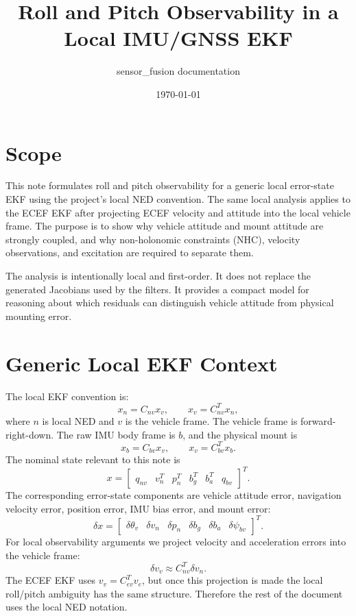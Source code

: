 \documentclass[11pt]{article}
\title{Roll and Pitch Observability in a Local IMU/GNSS EKF}
\author{sensor\_fusion documentation}
\date{\today}
\newcommand{\T}{^{T}}
\begin{document}
\maketitle
\tableofcontents
\newpage

\section{Scope}

This note formulates roll and pitch observability for a generic local
error-state EKF using the project's local NED convention. The same local
analysis applies to the ECEF EKF after projecting ECEF velocity and
attitude into the local vehicle frame. The purpose is to show why vehicle
attitude and mount attitude are strongly coupled, and why non-holonomic
constraints (NHC), velocity observations, and excitation are required to
separate them.

The analysis is intentionally local and first-order. It does not replace the
generated Jacobians used by the filters. It provides a compact model for
reasoning about which residuals can distinguish vehicle attitude from physical
mounting error.

\section{Generic Local EKF Context}

The local EKF convention is:
\begin{equation}
  x_n=C_{nv}x_v,\qquad x_v=C_{nv}\T x_n ,
\end{equation}
where \(n\) is local NED and \(v\) is the vehicle frame. The vehicle frame is
forward-right-down. The raw IMU body frame is \(b\), and the physical mount is
\begin{equation}
  x_b=C_{bv}x_v,\qquad x_v=C_{bv}\T x_b .
\end{equation}
The nominal state relevant to this note is
\begin{equation}
  x=
  \begin{bmatrix}
  q_{nv} & v_n\T & p_n\T & b_g\T & b_a\T & q_{bv}
  \end{bmatrix}\T .
\end{equation}
The corresponding error-state components are vehicle attitude error,
navigation velocity error, position error, IMU bias error, and mount error:
\begin{equation}
  \delta x=
  \begin{bmatrix}
  \delta\theta_v & \delta v_n & \delta p_n &
  \delta b_g & \delta b_a & \delta\psi_{bv}
  \end{bmatrix}\T .
\end{equation}
For local observability arguments we project velocity and acceleration errors
into the vehicle frame:
\begin{equation}
  \delta v_v \approx C_{nv}\T\delta v_n .
\end{equation}
The ECEF EKF uses \(v_v=C_{ev}\T v_e\), but once this projection is made the local
roll/pitch ambiguity has the same structure. Therefore the rest of the document
uses the local NED notation.
\end{document}
